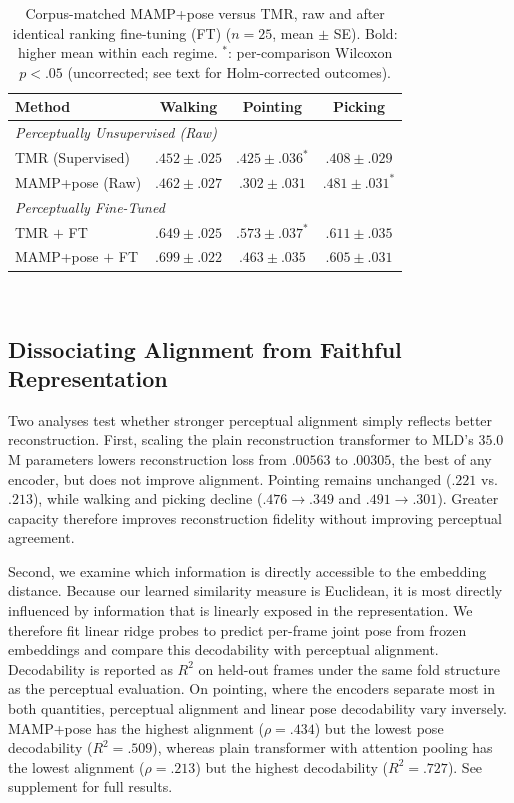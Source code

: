 \documentclass[letterpaper]{article} %
\begin{document}
\begin{table}[htbp]
\centering
\caption{Corpus-matched MAMP+pose versus TMR, raw and after identical ranking fine-tuning (FT)
($n=25$, mean $\pm$ SE). Bold: higher mean within each regime. $^{*}$: per-comparison Wilcoxon
$p<.05$ (uncorrected; see text for Holm-corrected outcomes).}
\setlength{\tabcolsep}{3pt}
\small
\begin{tabular}{lccc}
\toprule
Method & Walking & Pointing & Picking \\
\midrule
\multicolumn{4}{l}{\emph{Perceptually Unsupervised (Raw)}} \\
TMR (Supervised) & $.452{\scriptstyle\pm}.025$ & $\mathbf{.425{\scriptstyle\pm}.036}^{*}$ & $.408{\scriptstyle\pm}.029$ \\
MAMP+pose (Raw) & $\mathbf{.462{\scriptstyle\pm}.027}$ & $.302{\scriptstyle\pm}.031$ & $\mathbf{.481{\scriptstyle\pm}.031}^{*}$ \\
\midrule
\multicolumn{4}{l}{\emph{Perceptually Fine-Tuned}} \\
TMR $+$ FT & $.649{\scriptstyle\pm}.025$ & $\mathbf{.573{\scriptstyle\pm}.037}^{*}$ & $\mathbf{.611{\scriptstyle\pm}.035}$ \\
MAMP+pose $+$ FT & $\mathbf{.699{\scriptstyle\pm}.022}$ & $.463{\scriptstyle\pm}.035$ & $.605{\scriptstyle\pm}.031$ \\
\bottomrule
\end{tabular}~\label{tab:tmr}
\end{table}

\subsection{Dissociating Alignment from Faithful Representation}
Two analyses test whether stronger perceptual alignment simply reflects better reconstruction. First, scaling the plain reconstruction transformer to MLD's $35.0$M parameters lowers reconstruction loss from $.00563$ to $.00305$, the best of any encoder, but does not improve alignment. Pointing remains unchanged ($.221$ vs.\ $.213$), while walking and picking decline ($.476\to.349$ and $.491\to.301$). Greater capacity therefore improves reconstruction fidelity without improving perceptual agreement.

Second, we examine which information is directly accessible to the embedding distance. Because our learned similarity measure is Euclidean, it is most directly influenced by information that is linearly exposed in the representation. We therefore fit linear ridge probes to predict per-frame joint pose from frozen embeddings and compare this decodability with perceptual alignment. Decodability is reported as $R^2$ on held-out frames under the same fold structure as the perceptual evaluation. On pointing, where the encoders separate most in both quantities, perceptual alignment and linear pose decodability vary inversely. MAMP+pose has the highest alignment ($\rho=.434$) but the lowest pose decodability ($R^2=.509$), whereas plain transformer with attention pooling has the lowest alignment ($\rho=.213$) but the highest decodability ($R^2=.727$). See supplement for full results.
\end{document}
